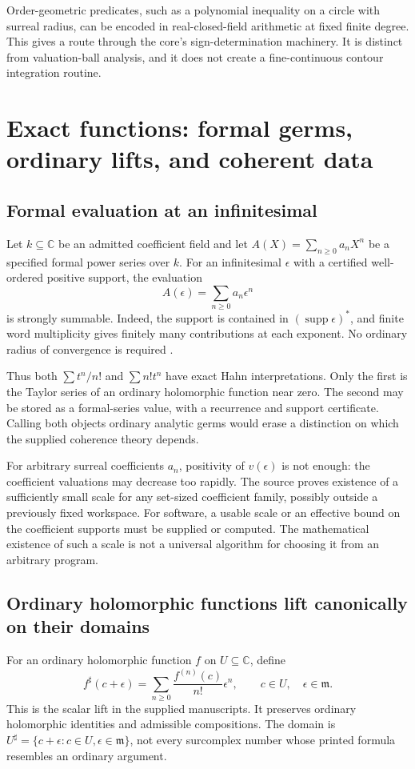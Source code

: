 \documentclass[11pt,letterpaper]{article}
\numberwithin{equation}{section}
\theoremstyle{definition}
\theoremstyle{remark}\newtheorem{remark}[theorem]{Remark}
\newcommand{\C}{\mathbb C}
\newcommand{\mm}{\mathfrak m}
\newcommand{\supp}{\operatorname{supp}}
\newcommand{\sh}{^{\sharp}}
\begin{document}
Order-geometric predicates, such as a polynomial inequality on a circle with
surreal radius, can be encoded in real-closed-field arithmetic at fixed finite
degree. This gives a route through the core's sign-determination machinery.
It is distinct from valuation-ball analysis, and it does not create a
fine-continuous contour integration routine.

\section{Exact functions: formal germs, ordinary lifts, and coherent data}
\label{sec:functions}

\subsection{Formal evaluation at an infinitesimal}
Let $k\subseteq\C$ be an admitted coefficient field and let
$A(X)=\sum_{n\ge0}a_nX^n$ be a specified formal power series over $k$.
For an infinitesimal $\epsilon$ with a certified well-ordered positive
support, the evaluation
\begin{equation}\label{eq:formaleval}
 A(\epsilon)=\sum_{n\ge0}a_n\epsilon^n
\end{equation}
is strongly summable. Indeed, the support is contained in
$(\supp\epsilon)^*$, and finite word multiplicity gives finitely many
contributions at each exponent. No ordinary radius of convergence is required
\cite{SourceAnalysis}.

Thus both $\sum t^n/n!$ and $\sum n!t^n$ have exact Hahn interpretations.
Only the first is the Taylor series of an ordinary holomorphic function near
zero. The second may be stored as a formal-series value, with a recurrence
and support certificate. Calling both objects ordinary analytic germs would
erase a distinction on which the supplied coherence theory depends.

For arbitrary surreal coefficients $a_n$, positivity of $v(\epsilon)$ is
not enough: the coefficient valuations may decrease too rapidly. The source
proves existence of a sufficiently small scale for any set-sized coefficient
family, possibly outside a previously fixed workspace. For software, a usable
scale or an effective bound on the coefficient supports must be supplied or
computed. The mathematical existence of such a scale is not a universal
algorithm for choosing it from an arbitrary program.

\subsection{Ordinary holomorphic functions lift canonically on their domains}
For an ordinary holomorphic function $f$ on $U\subseteq\C$, define
\begin{equation}\label{eq:lift}
 f\sh(c+\epsilon)=\sum_{n\ge0}\frac{f^{(n)}(c)}{n!}\epsilon^n,
 \qquad c\in U,\quad \epsilon\in\mm.
\end{equation}
This is the scalar lift in the supplied manuscripts. It preserves ordinary
holomorphic identities and admissible compositions. The domain is
$U\sh=\{c+\epsilon:c\in U,\epsilon\in\mm\}$, not every surcomplex number
whose printed formula resembles an ordinary argument.
\end{document}
